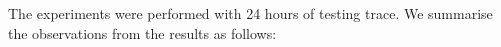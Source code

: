 The experiments were performed with 24 hours of testing trace. 
We summarise the observations from the results as follows:
